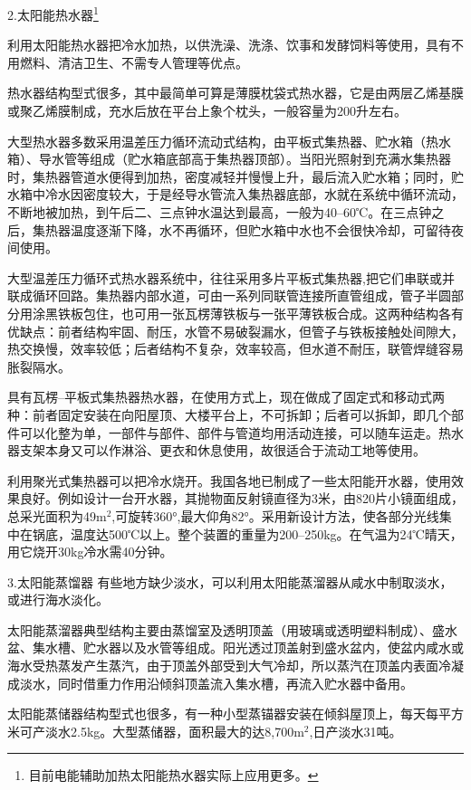 \documentclass{ctexbook}
\begin{document}
2.太阳能热水器\footnote{目前电能辅助加热太阳能热水器实际上应用更多。}

利用太阳能热水器把冷水加热，以供洗澡、洗涤、饮事和发酵饲料等使用，具有不用燃料、清洁卫生、不需专人管理等优点。

热水器结构型式很多，其中最简单可算是薄膜枕袋式热水器，它是由两层乙烯基膜或聚乙烯膜制成，充水后放在平台上象个枕头，一般容量为200升左右。

大型热水器多数采用温差压力循环流动式结构，由平板式集热器、贮水箱（热水箱）、导水管等组成（贮水箱底部高于集热器顶部）。当阳光照射到充满水集热器时，集热器管道水便得到加热，密度减轻并慢慢上升，最后流入贮水箱；同时，贮水箱中冷水因密度较大，于是经导水管流入集热器底部，水就在系统中循环流动，不断地被加热，到午后二、三点钟水温达到最高，一般为40--60℃。在三点钟之后，集热器温度逐渐下降，水不再循环，但贮水箱中水也不会很快冷却，可留待夜间使用。

大型温差压力循环式热水器系统中，往往采用多片平板式集热器,把它们串联或并联成循环回路。集热器内部水道，可由一系列同联管连接所直管组成，管子半圆部分用涂黑铁板包住，也可用一张瓦楞薄铁板与一张平薄铁板合成。这两种结构各有优缺点：前者结构牢固、耐压，水管不易破裂漏水，但管子与铁板接触处间隙大，热交换慢，效率较低；后者结构不复杂，效率较高，但水道不耐压，联管焊缝容易胀裂隔水。

具有瓦楞--平板式集热器热水器，在使用方式上，现在做成了固定式和移动式两种：前者固定安装在向阳屋顶、大楼平台上，不可拆卸；后者可以拆卸，即几个部件可以化整为单，一部件与部件、部件与管道均用活动连接，可以随车运走。热水器支架本身又可以作淋浴、更衣和休息使用，故很适合于流动工地等使用。

利用聚光式集热器可以把冷水烧开。我国各地已制成了一些太阳能开水器，使用效果良好。例如设计一台开水器，其抛物面反射镜直径为3米，由820片小镜面组成，总采光面积为49m$^{2}$,可旋转360°,最大仰角82°。采用新设计方法，使各部分光线集中在锅底，温度达500℃以上。整个装置的重量为200--250kg。在气温为24℃晴天，用它烧开30kg冷水需40分钟。

3.太阳能蒸馏器
有些地方缺少淡水，可以利用太阳能蒸溜器从咸水中制取淡水，或进行海水淡化。

太阳能蒸溜器典型结构主要由蒸馏室及透明顶盖（用玻璃或透明塑料制成）、盛水盆、集水槽、贮水器以及水管等组成。阳光透过顶盖射到盛水盆内，使盆内咸水或海水受热蒸发产生蒸汽，由于顶盖外部受到大气冷却，所以蒸汽在顶盖内表面冷凝成淡水，同时借重力作用沿倾斜顶盖流入集水槽，再流入贮水器中备用。

太阳能蒸储器结构型式也很多，有一种小型蒸锚器安装在倾斜屋顶上，每天每平方米可产淡水2.5kg。大型蒸储器，面积最大的达8,700m$^{2}$,日产淡水31吨。
\end{document}
